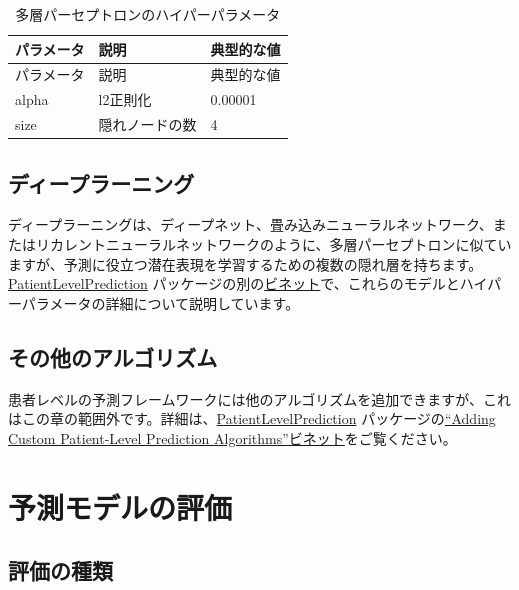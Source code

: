 \documentclass[
  11pt]{book}
\theoremstyle{definition}
\theoremstyle{definition}
\theoremstyle{definition}
\theoremstyle{definition}
\theoremstyle{remark}
\begin{document}
\begin{longtable}[]{@{}lll@{}}
\caption{\label{tab:mpParameters} 多層パーセプトロンのハイパーパラメータ}\tabularnewline
\toprule\noalign{}
パラメータ & 説明 & 典型的な値 \\
\midrule\noalign{}
\endfirsthead
\toprule\noalign{}
パラメータ & 説明 & 典型的な値 \\
\midrule\noalign{}
\endhead
\bottomrule\noalign{}
\endlastfoot
alpha & l2正則化 & 0.00001 \\
size & 隠れノードの数 & 4 \\
\end{longtable}

\subsection{ディープラーニング}\label{ux30c7ux30a3ux30fcux30d7ux30e9ux30fcux30cbux30f3ux30b0}

ディープラーニングは、ディープネット、畳み込みニューラルネットワーク、またはリカレントニューラルネットワークのように、多層パーセプトロンに似ていますが、予測に役立つ潜在表現を学習するための複数の隠れ層を持ちます。\href{https://ohdsi.github.io/PatientLevelPrediction/}{PatientLevelPrediction} パッケージの別の\href{https://ohdsi.github.io/PatientLevelPrediction/articles/BuildingDeepLearningModels.html}{ビネット}で、これらのモデルとハイパーパラメータの詳細について説明しています。   

\subsection{その他のアルゴリズム}\label{ux305dux306eux4ed6ux306eux30a2ux30ebux30b4ux30eaux30baux30e0}

患者レベルの予測フレームワークには他のアルゴリズムを追加できますが、これはこの章の範囲外です。詳細は、\href{https://ohdsi.github.io/PatientLevelPrediction/}{PatientLevelPrediction} パッケージの\href{https://ohdsi.github.io/PatientLevelPrediction/articles/AddingCustomAlgorithms.html}{``Adding Custom Patient-Level Prediction Algorithms''ビネット}をご覧ください。

\section{予測モデルの評価}\label{ux4e88ux6e2cux30e2ux30c7ux30ebux306eux8a55ux4fa1}

\subsection{評価の種類}\label{ux8a55ux4fa1ux306eux7a2eux985e}
\end{document}
